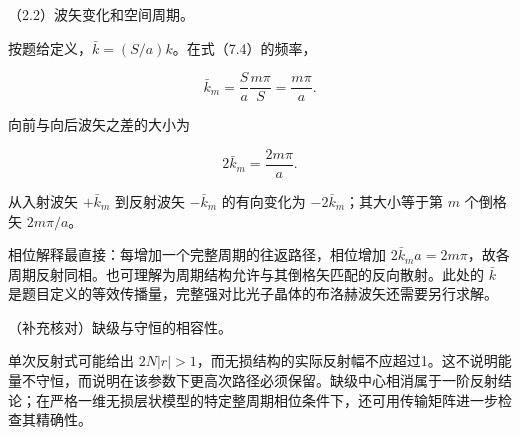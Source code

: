 \documentclass[12pt,a4paper,fontset=fandol]{ctexart}
\begin{document}
\begin{center}
\begin{minipage}{\linewidth}
\centering\begingroup
{}
\ifdim\wd\diagrambox>.88\linewidth
\sbox{\diagrambox}{\resizebox{.88\linewidth}{!}{\usebox{\diagrambox}}}
\fi
\ifdim\ht\diagrambox>.29\textheight
\resizebox{!}{.29\textheight}{\usebox{\diagrambox}}
\else\usebox{\diagrambox}\fi
\par{}
\endgroup\end{minipage}
\end{center}

（2.2）波矢变化和空间周期。

按题给定义，\(\bar k=(S/a)k\)。在式（7.4）的频率，

\[
\bar k_m=\frac{S}{a}\frac{m\pi}{S}=\frac{m\pi}{a}.
\]

向前与向后波矢之差的大小为

\[
\boxed{2\bar k_m=\frac{2m\pi}{a}.}
\tag{7.7}
\]

从入射波矢 \(+\bar k_m\) 到反射波矢 \(-\bar k_m\) 的有向变化为
\(-2\bar k_m\)；其大小等于第 \(m\) 个倒格矢 \(2m\pi/a\)。

相位解释最直接：每增加一个完整周期的往返路径，相位增加
\(2\bar k_ma=2m\pi\)，故各周期反射同相。也可理解为周期结构允许与其倒格矢匹配的反向散射。此处的
\(\bar k\)
是题目定义的等效传播量，完整强对比光子晶体的布洛赫波矢还需要另行求解。

（补充核对）缺级与守恒的相容性。

单次反射式可能给出
\(2N|r|>1\)，而无损结构的实际反射幅不应超过1。这不说明能量不守恒，而说明在该参数下更高次路径必须保留。缺级中心相消属于一阶反射结论；在严格一维无损层状模型的特定整周期相位条件下，还可用传输矩阵进一步检查其精确性。
\end{document}

